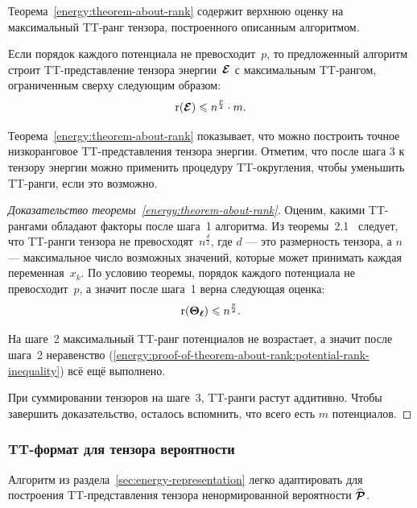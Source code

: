 Теорема~\ref{energy:theorem-about-rank} содержит верхнюю оценку на максимальный TT\hyp{}ранг тензора, построенного описанным алгоритмом.

\begin{theorem}
\label{energy:theorem-about-rank}
Если порядок каждого потенциала не превосходит~$p$, то предложенный алгоритм строит TT\hyp{}представление тензора энергии~$\boldsymbol{\mathcal{E}}$ с максимальным TT\hyp{}рангом, ограниченным сверху следующим образом:
\begin{equation}
\label{energy:theorem-about-rank:inequality}
\operatorname{r}(\boldsymbol{\mathcal{E}}) \leqslant n^{\frac{p}{2}} \cdot m.
\end{equation}
\end{theorem}

Теорема~\ref{energy:theorem-about-rank} показывает, что можно построить точное низкоранговое TT\hyp{}представления тензора энергии. Отметим, что после шага 3 к тензору энергии можно применить процедуру TT\hyp{}округления, чтобы уменьшить TT\hyp{}ранги, если это возможно.

\begin{proof}[Доказательство теоремы~\ref{energy:theorem-about-rank}]
Оценим, какими TT\hyp{}рангами обладают факторы после шага~1 алгоритма.
Из теоремы~2.1~\cite{oseledets2011ttMain} следует, что TT\hyp{}ранги тензора не превосходят~$n^{\frac{d}{2}}$, где $d$ --- это размерность тензора, а $n$ --- максимальное число возможных значений, которые может принимать каждая переменная~$x_k$.
По условию теоремы, порядок каждого потенциала не превосходит~$p$, а значит после шага~1 верна следующая оценка:
\begin{equation}
\label{energy:proof-of-theorem-about-rank:potential-rank-inequality}
\operatorname{r}(\boldsymbol{\Theta_\ell}) \leqslant n^{\frac{p}{2}}.
\end{equation}

На шаге~2 максимальный TT\hyp{}ранг потенциалов не возрастает, а значит после шага~2 неравенство (\ref{energy:proof-of-theorem-about-rank:potential-rank-inequality}) всё ещё выполнено.

При суммировании тензоров на шаге~3, TT\hyp{}ранги растут аддитивно. Чтобы завершить доказательство, осталось вспомнить, что всего есть $m$ потенциалов.
\end{proof}

\subsubsection{TT\hyp{}формат для тензора вероятности}
\label{sec:prob-representation}
Алгоритм из раздела~\ref{sec:energy-representation} легко адаптировать для построения TT\hyp{}представления тензора ненормированной вероятности $\widehat{\boldsymbol{\mathcal{P}}}$.

